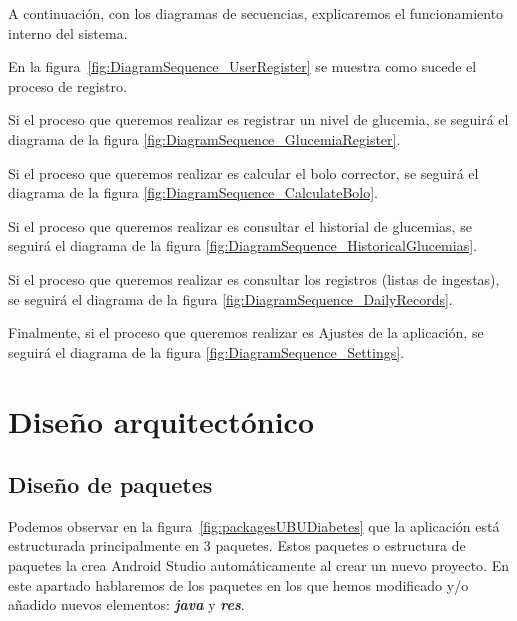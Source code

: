 A continuación, con los diagramas de secuencias, explicaremos el funcionamiento interno del sistema.


En la figura~\ref{fig:DiagramSequence_UserRegister} se muestra como sucede el proceso de registro.

Si el proceso que queremos realizar es registrar un nivel de glucemia, se seguirá el diagrama de la figura \ref{fig:DiagramSequence_GlucemiaRegister}.

Si el proceso que queremos realizar es calcular el bolo corrector, se seguirá el diagrama de la figura \ref{fig:DiagramSequence_CalculateBolo}.

Si el proceso que queremos realizar es consultar el historial de glucemias, se seguirá el diagrama de la figura \ref{fig:DiagramSequence_HistoricalGlucemias}.

Si el proceso que queremos realizar es consultar los registros (listas de ingestas), se seguirá el diagrama de la figura \ref{fig:DiagramSequence_DailyRecords}.

Finalmente, si el proceso que queremos realizar es Ajustes de la aplicación, se seguirá el diagrama de la figura \ref{fig:DiagramSequence_Settings}.
\section{Diseño arquitectónico}
\subsection{Diseño de paquetes}\label{sec:disenopaquetes}
Podemos observar en la figura~\ref{fig:packagesUBUDiabetes} que la aplicación está estructurada principalmente en 3 paquetes. Estos paquetes o estructura de paquetes la crea Android Studio automáticamente al crear un nuevo proyecto.
En este apartado hablaremos de los paquetes en los que hemos modificado y/o añadido nuevos elementos: \textbf{\textit{java}} y \textbf{\textit{res}}.
